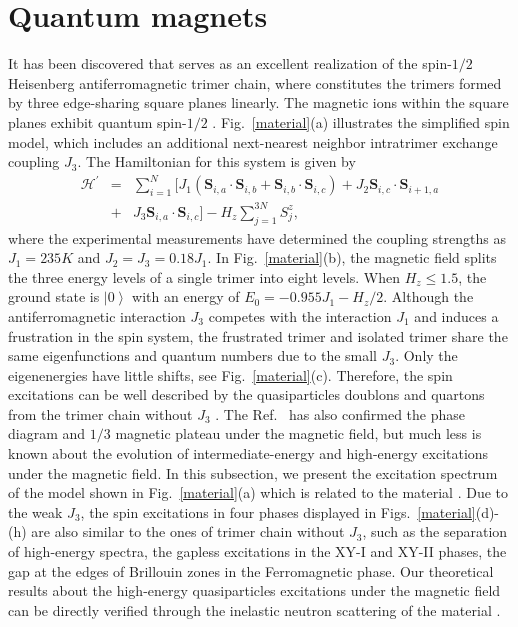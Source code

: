 \documentclass[aps,prx,showpacs,floatfix,twocolumn,superscriptaddress,nofootinbib,longbibliography]{revtex4-2}
\begin{document}
\section{Quantum  magnets}

It has been  discovered that   serves as an excellent realization of the spin-$1/2$ Heisenberg antiferromagnetic trimer chain, where   constitutes the  trimers formed by three edge-sharing  square planes linearly. The magnetic  ions within
the  square planes exhibit quantum spin-$1/2$ \cite{JAP2014,bera2022emergent}.  Fig.~\ref{material}(a)  illustrates the simplified spin model, which includes an additional next-nearest neighbor intratrimer exchange coupling $J_3$. The Hamiltonian for this system is given by 
\begin{eqnarray}
	\mathcal{H}^\prime&=&\sum_{i=1}^{N} [ J_1 \left(\mathbf{S}_{i,a}\cdot \mathbf{S}_{i,b} +\mathbf{S}_{i,b} \cdot \mathbf{S}_{i,c} \right)
	+ J_2 \mathbf{S}_{i,c} \cdot\mathbf{S}_{i+1,a} \nonumber \\
	 &+& J_3 \mathbf{S}_{i,a} \cdot\mathbf{S}_{i,c}]
	-H_z \sum_{j=1}^{3N} S_j^z,
\end{eqnarray}
where the experimental measurements have determined the coupling strengths as $J_1 =235K$ and $J_2=J_3=0.18J_1$. In Fig.~\ref{material}(b), the magnetic field splits the three energy levels of a single trimer into eight levels. When $H_z \leq 1.5$, 
the ground state is $\left|0\right\rangle$ with an energy of $E_0 =-0.955 J_1 -H_z /2$. 
 Although the antiferromagnetic interaction $J_3$ competes with the interaction $J_1$ and induces a frustration in the spin system, the frustrated trimer and isolated trimer share the same eigenfunctions and quantum numbers due to the small $J_3$. Only the eigenenergies have little shifts, see Fig.~\ref{material}(c). Therefore, the spin excitations can be well described by the  quasiparticles doublons and quartons from the trimer chain without $J_3$ \cite{cheng2022}.  The Ref.~\cite{bera2022emergent}  has also confirmed the phase diagram and $1/3$ magnetic plateau under the magnetic field, but much less is  known about the  evolution of intermediate-energy and high-energy excitations   under the magnetic field. In this subsection, we present the  excitation spectrum  of the model shown in Fig.~\ref{material}(a) which is related to the material .  Due to the weak $J_3$,  the spin excitations  in four phases displayed in Figs.~\ref{material}(d)-(h) are also similar to the ones of trimer chain without $J_3$, such as the separation of high-energy spectra, the gapless excitations in the XY-I and XY-II phases, the gap at the edges of Brillouin zones in the Ferromagnetic phase. Our theoretical results about the high-energy quasiparticles excitations under the magnetic field can be directly  verified through the inelastic neutron scattering of the material . 
\end{document}
